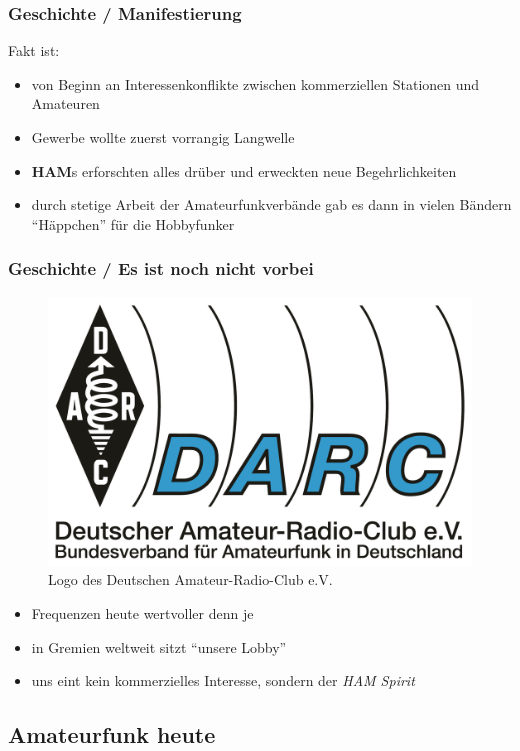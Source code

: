 \begin{frame}
  \frametitle{Geschichte / Manifestierung}

  Fakt ist:

  \begin{itemize}
    \item von Beginn an Interessenkonflikte zwischen kommerziellen Stationen
      und Amateuren
    \item Gewerbe wollte zuerst vorrangig Langwelle
    \item \textbf{HAM}s erforschten alles drüber und erweckten neue
      Begehrlichkeiten
    \item durch stetige Arbeit der Amateurfunkverbände gab es dann in
      vielen Bändern ``Häppchen'' für die Hobbyfunker
  \end{itemize}

\end{frame}

\begin{frame}
  \frametitle{Geschichte / Es ist noch nicht vorbei}

  \begin{center}
    \begin{figure}
      \includegraphics[height=0.3\textheight,width=.5\textwidth,keepaspectratio]{bv01/DARC_Logo.pdf}
      \caption{Logo des Deutschen Amateur-Radio-Club e.V.}
    \end{figure}
  \end{center}

  \begin{itemize}
    \item Frequenzen heute wertvoller denn je
    \item in Gremien weltweit sitzt ``unsere Lobby''
    \item uns eint kein kommerzielles Interesse, sondern der
      \emph{HAM Spirit} \hyperlink{refs}{\cite{wp}}
  \end{itemize}

\end{frame}

\subsection{Amateurfunk heute}

